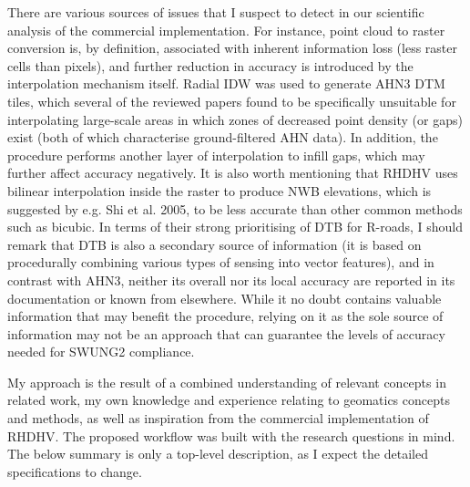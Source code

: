 There are various sources of issues  that I suspect to detect in our scientific analysis of the commercial implementation. For instance, point cloud to raster conversion is, by definition, associated with inherent information loss (less raster cells than pixels), and further reduction in accuracy is introduced by the interpolation mechanism itself. Radial IDW was used to generate AHN3 DTM tiles, which several of the reviewed papers found to be specifically unsuitable for interpolating large-scale areas in which zones of decreased point density (or gaps) exist (both of which characterise ground-filtered AHN data). In addition, the procedure performs another layer of interpolation to infill gaps, which may further affect accuracy negatively. It is also worth mentioning that RHDHV uses bilinear interpolation inside the raster to produce NWB elevations, which is suggested by e.g. Shi et al. 2005, to be less accurate than other common methods such as bicubic. In terms of their strong prioritising of DTB for R-roads, I should remark that DTB is also a secondary source of information (it is based on procedurally combining various types of sensing into vector features), and in contrast with AHN3, neither its overall nor its local accuracy are reported in its documentation or known from elsewhere. While it no doubt contains valuable information that may benefit the procedure, relying on it as the sole source of information may not be an approach that can guarantee the levels of accuracy needed for SWUNG2 compliance.

My approach is the result of a combined understanding of relevant concepts in related work, my own knowledge and experience relating to geomatics concepts and methods, as well as inspiration from the commercial implementation of RHDHV. The proposed workflow was built with the research questions in mind. The below summary is only a top-level description, as I expect the detailed specifications to change.

